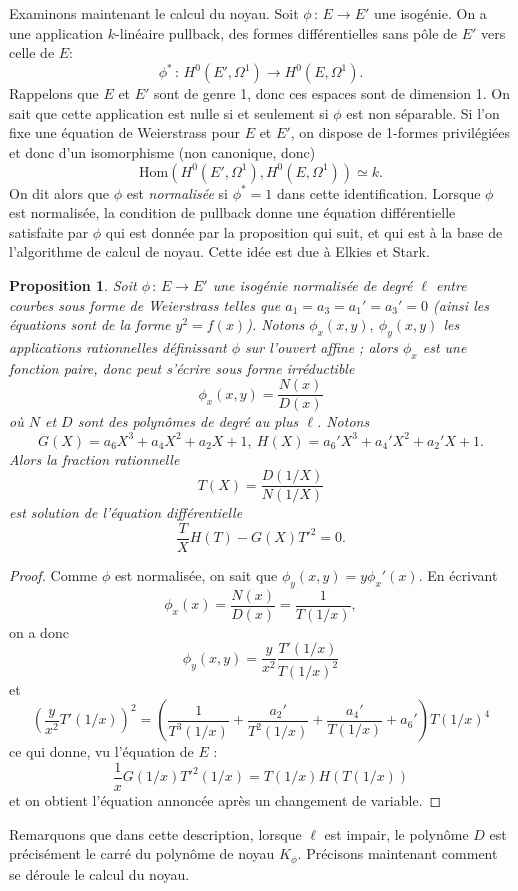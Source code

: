 \documentclass[11pt,a4paper]{article}
\newcommand{\vers}{\longrightarrow}
\newcommand{\Hom}{\mathrm{Hom}}
\newcommand{\de}{\,:\,}
\renewcommand{\v}{\vspace{5mm}}
\newtheorem*{prop}{Proposition}
\theoremstyle{definition}
\begin{document}
\v
Examinons maintenant le calcul du noyau. Soit $\phi\de E\vers E'$ une isogénie. On a une application $k$-linéaire \og pullback\fg, des formes différentielles sans pôle de $E'$ vers celle de $E$:
$$\phi^*\de H^0(E', \Omega^1)\vers H^0(E, \Omega^1).$$
Rappelons que $E$ et $E'$ sont de genre 1, donc ces espaces sont de dimension 1. On sait que cette application est nulle si et seulement si $\phi$ est non séparable. Si l'on fixe une équation de Weierstrass pour $E$ et $E'$, on dispose de 1-formes privilégiées et donc d'un isomorphisme (non canonique, donc)
$$\Hom(H^0(E', \Omega^1), H^0(E, \Omega^1))\simeq k.$$
On dit alors que $\phi$ est \emph{normalisée} si $\phi^* = 1$ dans cette identification. Lorsque $\phi$ est normalisée, la condition de pullback donne une équation différentielle satisfaite par $\phi$ qui est donnée par la proposition qui suit, et qui est à la base de l'algorithme de calcul de noyau. Cette idée est due à Elkies et Stark.

\begin{prop}
Soit $\phi\de E\vers E'$ une isogénie normalisée de degré $\ell$ entre courbes sous forme de Weierstrass telles que $a_1 = a_3 = a_1' = a_3' = 0$ (ainsi les équations sont de la forme $y^2 = f(x)$). Notons $\phi_x(x,y),\ \phi_y(x,y)$ les applications rationnelles définissant $\phi$ sur l'ouvert affine ; alors $\phi_x$ est une fonction paire, donc peut s'écrire sous forme irréductible
$$\phi_x(x, y) = \frac{N(x)}{D(x)}$$
où $N$ et $D$ sont des polynômes de degré au plus $\ell$. Notons
$$G(X) = a_6 X^3 + a_4 X^2 + a_2 X + 1,\ H(X) =a_6' X^3 + a_4' X^2 + a_2' X + 1.$$
Alors la fraction rationnelle 
$$T(X) = \frac{D(1/X)}{N(1/X)}$$
est solution de l'équation différentielle
$$\frac{T}{X} H(T) - G(X) T'^2 = 0.$$
\end{prop}

\begin{proof}
Comme $\phi$ est normalisée, on sait que $\phi_y (x, y) = y \phi_x'(x).$ En écrivant 
$$\phi_x(x) = \frac{N(x)}{D(x)} = \frac{1}{T(1/x)},$$
on a donc
$$\phi_y(x, y) = \frac{y}{x^2} \frac{T'(1/x)}{T(1/x)^2}$$
et
$$ \left(\frac{y}{x^2} T'(1/x)\right)^2 = \left(\frac{1}{T^3(1/x)} + \frac{a_2'}{T^2(1/x)} + \frac{a_4'}{T(1/x)} + a_6'\right)T(1/x)^4$$
ce qui donne, vu l'équation de $E$ :
$$ \frac{1}{x} G(1/x) T'^2(1/x) =T(1/x) H(T(1/x))$$
et on obtient l'équation annoncée après un changement de variable.
\end{proof}

Remarquons que dans cette description, lorsque $\ell$ est impair, le polynôme $D$ est précisément le carré du polynôme de noyau $K_\phi$. Précisons maintenant comment se déroule le calcul du noyau.
\end{document}
